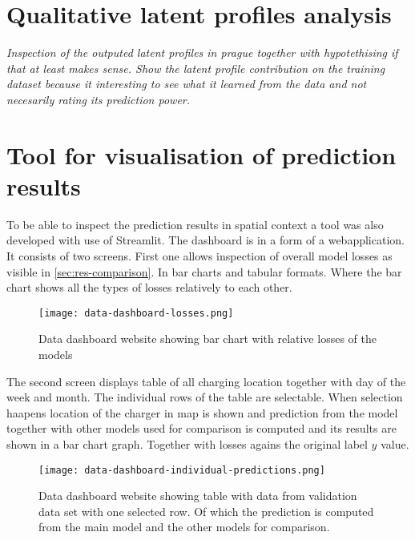 \section{Qualitative latent profiles analysis}

\textit{Inspection of the outputed latent profiles in prague together with hypotethising if that at least makes sense. Show the latent profile contribution on the training dataset because it interesting to see what it learned from the data and not necesarily rating its prediction power.}


\section{Tool for visualisation of prediction results}
To be able to inspect the prediction results in spatial context a tool was also developed with use of Streamlit. The dashboard is in a form of a webapplication.
It consists of two screens.
First one allows inspection of overall model losses as visible in \ref{sec:res-comparison}. In bar charts and tabular formats. Where the bar chart shows all the types of losses relatively to each other.
\begin{figure}
    \texttt{[image: data-dashboard-losses.png]}
    \caption[]{Data dashboard website showing bar chart with relative losses of the models}
\end{figure}

The second screen displays table of all charging location together with day of the week and month. The individual rows of the table are selectable. When selection haapens location of the charger in map is shown and prediction from the model together with other models used for comparison is computed and its results are shown in a bar chart graph. Together with losses agains the original label $y$ value.

\begin{figure}
    \texttt{[image: data-dashboard-individual-predictions.png]}
    \caption[]{Data dashboard website showing table with data from validation data set with one selected row. Of which the prediction is computed from the main model and the other models for comparison.}
\end{figure}
